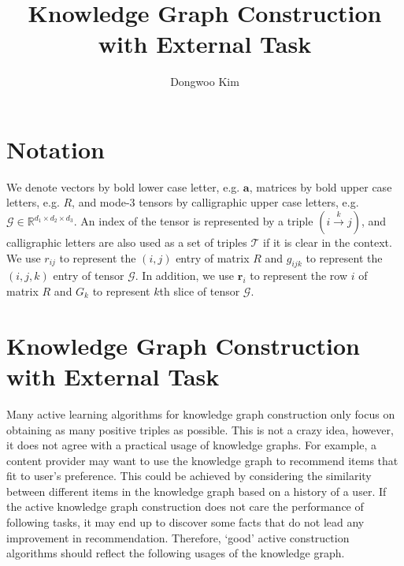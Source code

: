 \documentclass{article} %
\title{Knowledge Graph Construction with External Task}
\author{
Dongwoo Kim
}
\theoremstyle{definition}
\newcommand\ts{\mathcal} %
\newcommand\mt{} %
\newcommand\vt{\mathbf} %
\newcommand\triple[3]{(#1 \stackrel{#2}\rightarrow #3)}
\begin{document}
\maketitle

\section{Notation}
We denote vectors by bold lower case letter, e.g. $\vt{a}$, matrices by bold upper case letters, e.g. $\mt{R}$, and mode-3 tensors by calligraphic upper case letters, e.g. $\ts{G} \in \mathbb{R}^{d_1 \times d_2 \times d_3}$. An index of the tensor is represented by a triple $\triple{i}{k}{j}$, and calligraphic letters are also used as a set of triples $\ts{T}$ if it is clear in the context. We use $r_{ij}$ to represent the $(i,j)$ entry of matrix $\mt{R}$ and $g_{ijk}$ to represent the $(i,j,k)$ entry of tensor $\ts{G}$. In addition, we use $\vt{r}_i$ to represent the row $i$ of matrix $\mt{R}$ and $G_k$ to represent $k$th slice of tensor $\ts{G}$.

\section{Knowledge Graph Construction with External Task}

Many active learning algorithms for knowledge graph construction only focus on obtaining as many positive triples as possible. This is not a crazy idea, however, it does not agree with a practical usage of knowledge graphs. For example, a content provider may want to use the knowledge graph to recommend items that fit to user's preference. This could be achieved by considering the similarity between different items in the knowledge graph based on a history of a user. If the active knowledge graph construction does not care the performance of following tasks, it may end up to discover some facts that do not lead any improvement in recommendation. Therefore, `good' active construction algorithms should reflect the following usages of the knowledge graph.
\end{document}
